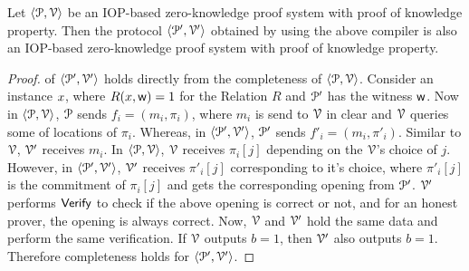 \begin{lemma}\label{lemma:compiler}
	Let $\langle \mathcal{P},\mathcal{V}\rangle$ be an IOP-based zero-knowledge proof system with proof of knowledge property. Then the protocol $\langle \mathcal{P}',\mathcal{V}'\rangle$ obtained by using the above compiler is also an IOP-based zero-knowledge proof system with proof of knowledge property.
\end{lemma}
\begin{proof}
	
%	
%	
	
	
	
	
	 of $\langle \mathcal{P}', \mathcal{V}' \rangle$ holds directly from the completeness of $\langle \mathcal{P}, \mathcal{V} \rangle$. 
	Consider an instance ${x}$, where $R({x},\mathsf{w}) = 1$ for the Relation $R$ and $\mathcal{P}'$ has the witness $\mathsf{w}$. 
	Now in $\langle \mathcal{P},\mathcal{V}\rangle$, $\mathcal{P}$ sends $f_i = (m_i, \pi_i)$, where $m_i$ is send to $\mathcal{V}$ in clear and $\mathcal{V}$ queries some of locations of $\pi_i$. Whereas, in $\langle \mathcal{P}',\mathcal{V}'\rangle$, $\mathcal{P}'$ sends $f'_i = (m_i, \pi'_i)$. 
	Similar to $\mathcal{V}$, $\mathcal{V}'$ receives $m_i$. In $\langle \mathcal{P},\mathcal{V}\rangle$, $\mathcal{V}$ receives $\pi_i[j]$ depending on the $\mathcal{V}$'s choice of $j$. 
	However, in $\langle \mathcal{P}',\mathcal{V}'\rangle$, $\mathcal{V}'$ receives $\pi'_i[j]$ corresponding to it's choice, where $\pi'_i[j]$ is the commitment of $\pi_i[j]$ and gets the corresponding opening from $\mathcal{P}'$. 
	$\mathcal{V}'$ performs $\mathsf{Verify}$ to check if the above opening is correct or not, and for an honest prover, the opening is always correct.
	Now, $\mathcal{V}$ and $\mathcal{V}'$ hold the same data and perform the same verification. If $\mathcal{V}$ outputs $b = 1$, then $\mathcal{V}'$ also outputs $b = 1$. Therefore completeness holds for $\langle \mathcal{P}',\mathcal{V}'\rangle$.
	

\end{proof}
